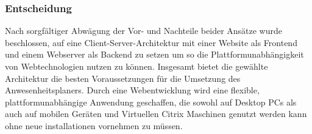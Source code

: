 \subsubsection{Entscheidung}
\label{sec:Entscheidung}
Nach sorgfältiger Abwägung der Vor- und Nachteile beider Ansätze wurde beschlossen, auf eine Client-Server-Architektur mit einer Website als Frontend und einem Webserver als Backend zu setzen um so die Plattformunabhängigkeit von Webtechnologien nutzen zu können. Insgesamt bietet die gewählte Architektur die besten Voraussetzungen für die Umsetzung des Anwesenheitsplaners. Durch eine Webentwicklung wird eine flexible, plattformunabhängige Anwendung geschaffen, die sowohl auf Desktop PCs als auch auf mobilen Geräten und Virtuellen Citrix Maschinen genutzt werden kann ohne neue installationen vornehmen zu müssen.




